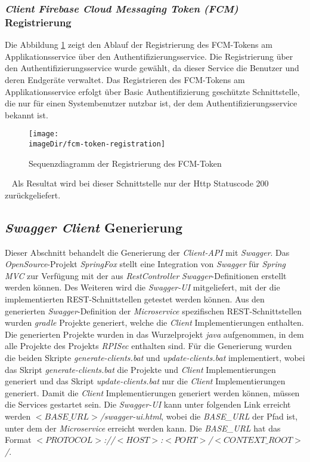 \documentclass[]{article}
\newcommand{\imageDir}{../../images}
\begin{document}
{{{{\subsubsection{\emph{Client} \emph{Firebase Cloud Messaging Token (FCM)} Registrierung}
Die Abbildung \ref{fig:image-sequence-fcm-token-registration} zeigt den Ablauf der Registrierung des FCM-Tokens am Applikationsservice über den Authentifizierungsservice. Die Registrierung über den Authentifizierungsservice wurde gewählt, da dieser Service die Benutzer und deren Endgeräte verwaltet. Das Registrieren des FCM-Tokens am Applikationsservice erfolgt über Basic Authentifizierung geschützte Schnittstelle, die nur für einen Systembenutzer nutzbar ist, der dem Authentifizierungsservice bekannt ist. 
\newpage
\begin{figure}[h]
	\centering
	\texttt{[image: \\imageDir/fcm-token-registration]}
	\caption{Sequenzdiagramm der Registrierung des FCM-Token}
	\label{fig:image-sequence-fcm-token-registration}
\end{figure}
\ \newline
Als Resultat wird bei dieser Schnittstelle nur der Http Statuscode 200 zurückgeliefert.

\subsection{\emph{Swagger Client} Generierung}
\label{sec:swagger-client-generation}
Dieser Abschnitt behandelt die Generierung der \emph{Client-API} mit \emph{Swagger}. Das \emph{OpenSource}-Projekt \emph{SpringFox} stellt eine Integration von \emph{Swagger} für \emph{Spring MVC} zur Verfügung mit der aus \emph{RestController} \emph{Swagger}-Definitionen erstellt werden können. Des Weiteren wird die \emph{Swagger-UI} mitgeliefert, mit der die implementierten REST-Schnittstellen getestet werden können.
\newline
\newline
Aus den generierten \emph{Swagger}-Definition der \emph{Microservice} spezifischen REST-Schnittstellen wurden \emph{gradle} Projekte generiert, welche die \emph{Client} Implementierungen enthalten. Die generierten Projekte wurden in das Wurzelprojekt \emph{java} aufgenommen, in dem alle Projekte des Projekts \emph{RPISec} enthalten sind.
\newline
\newline
Für die Generierung wurden die beiden Skripte \emph{generate-clients.bat} und \emph{update-clients.bat} implementiert, wobei das Skript \emph{generate-clients.bat} die Projekte und \emph{Client} Implementierungen generiert und das Skript \emph{update-clients.bat} nur die \emph{Client} Implementierungen generiert. Damit die \emph{Client} Implementierungen generiert werden können, müssen die Services gestartet sein.
\newline
\newline
Die \emph{Swagger-UI} kann unter folgenden Link erreicht werden \emph{$<BASE\_URL>$/swagger-ui.html}, wobei die \emph{BASE\_URL} der Pfad ist, unter dem der \emph{Microservice} erreicht werden kann. Die \emph{BASE\_URL} hat das Format \emph{$<PROTOCOL>$://$<HOST>$:$<PORT>$/$<CONTEXT\_ROOT>$/}. 
\newpage

}}}}
\end{document}

